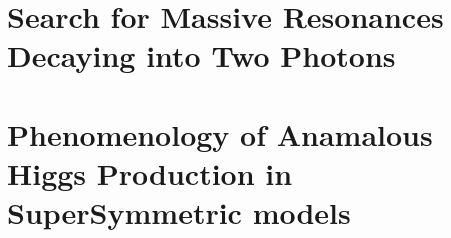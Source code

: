 \documentclass[12pt]{caltech_thesis}
\begin{document}
\printbibliography[heading=bibintoc]

 
\appendix

\chapter{Search for Massive Resonances Decaying into Two Photons}
\chapter{Phenomenology of Anamalous Higgs Production in SuperSymmetric models}

\printindex

\theendnotes

\end{document}
